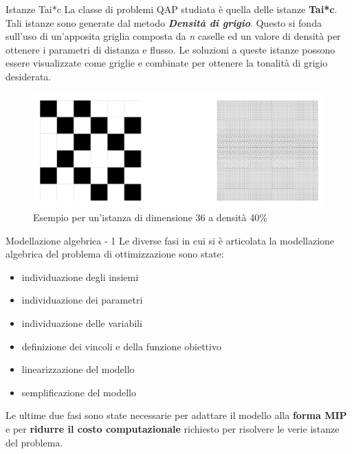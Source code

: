 \documentclass[a4paper]{beamer}
\begin{document}
\begin{frame}{Istanze Tai*c}
La classe di problemi QAP studiata è quella delle istanze \textbf{Tai*c}.
\newline \newline
Tali istanze sono generate dal metodo \textbf{\textit{Densità di grigio}}.
Questo si fonda sull'uso di un'apposita griglia composta da \textit{n} caselle ed un valore di densità per ottenere i parametri 
di distanza e flusso.
\newline \newline
Le soluzioni a queste istanze possono essere visualizzate come griglie e combinate per ottenere la tonalità di grigio desiderata.
\begin{figure}[h!]
    \centering
\includegraphics[scale=0.12]{images/gray_36_40.png}
\caption{Esempio per un'istanza di dimensione 36 a densità 40\%}
\end{figure}   
\end{frame}

\begin{frame}{Modellazione algebrica - 1}
Le diverse fasi in cui si è articolata la modellazione algebrica del problema di ottimizzazione sono state:
\begin{itemize}
\item individuazione degli insiemi
\item individuazione dei parametri
\item individuazione delle variabili
\item definizione dei vincoli e della funzione obiettivo
\item linearizzazione del modello 
\item semplificazione del modello
\end{itemize}
\vfill
Le ultime due fasi sono state necessarie per adattare il modello alla \textbf{forma MIP} e per \textbf{ridurre il costo computazionale}
richiesto per risolvere le verie istanze del problema.
\end{frame}
\end{document}
